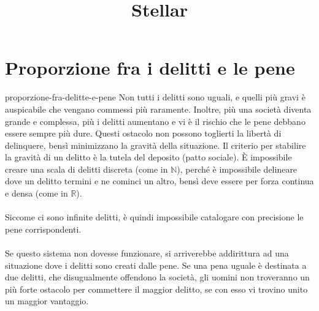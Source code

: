 \documentclass[preview]{standalone}
\begin{document}
\title{Stellar}
\genpage

\section{Proporzione fra i delitti e le pene}

\begin{snippet}{proporzione-fra-delitte-e-pene}
    Non tutti i delitti sono uguali, e quelli più gravi è auspicabile che vengano
    commessi più raramente.
    Inoltre, più una società diventa grande e complessa, più i delitti aumentano
    e vi è il rischio che le pene debbano essere sempre più dure.
    Questi ostacolo non possono toglierti la libertà di delinquere, bensì minimizzano la
    gravità della situazione.
    Il criterio per stabilire la gravità di un delitto è la tutela del deposito (patto sociale).
    È impossibile creare una scala di delitti discreta (come in \(\mathbb{N}\)),
    perché è impossibile delineare dove un delitto termini e ne cominci un altro,
    bensì deve essere per forza continua e densa (come in \(\mathbb{R}\)).
    \\\\
    Siccome ci sono infinite delitti, è quindi impossibile catalogare
    con precisione le pene corrispondenti.
    \\\\
    Se questo sistema non dovesse funzionare, si arriverebbe addirittura ad una situazione
    dove i delitti sono creati dalle pene.
    Se una pena uguale è destinata a due delitti, che disugualmente offendono la società, gli
    uomini non troveranno un più forte ostacolo per commettere il
    maggior delitto, se con esso vi trovino unito un maggior vantaggio.
\end{snippet}
\end{document}
